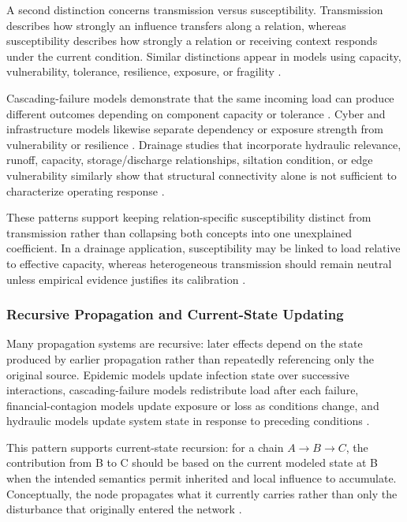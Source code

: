 A second distinction concerns transmission versus susceptibility.
Transmission describes how strongly an influence transfers along a
relation, whereas susceptibility describes how strongly a relation or
receiving context responds under the current condition. Similar
distinctions appear in models using capacity, vulnerability, tolerance,
resilience, exposure, or fragility \citep{buldyrev2010,he2019,
kavallieratos2021,faraji2026}.

Cascading-failure models demonstrate that the same incoming load can
produce different outcomes depending on component capacity or tolerance
\citep{buldyrev2010,he2019,shuang2017}. Cyber and infrastructure models likewise separate
dependency or exposure strength from vulnerability or resilience
\citep{kavallieratos2021,faraji2026,zhou2023}. Drainage studies that incorporate hydraulic
relevance, runoff, capacity, storage/discharge relationships, siltation
condition, or edge vulnerability similarly show that structural
connectivity alone is not sufficient to characterize operating response
\citep{simone2022,simone2023,reyes2020,dastgir2023,dastgir2024,meijer2023,zhang2025}.

These patterns support keeping relation-specific susceptibility distinct
from transmission rather than collapsing both concepts into one
unexplained coefficient. In a drainage application, susceptibility may be
linked to load relative to effective capacity, whereas heterogeneous
transmission should remain neutral unless empirical evidence justifies its
calibration \citep{dastgir2023,meijer2023,zhang2025}.

\subsubsection{Recursive Propagation and Current-State
Updating}\label{recursive-propagation-and-current-state-updating}

Many propagation systems are recursive: later effects depend on the
state produced by earlier propagation rather than repeatedly referencing
only the original source. Epidemic models update infection state over
successive interactions, cascading-failure models redistribute load
after each failure, financial-contagion models update exposure or loss
as conditions change, and hydraulic models update system state in
response to preceding conditions \citep{kermack1927,buldyrev2010,
he2019,faraji2026,petrone2018}.

This pattern supports current-state recursion: for a chain
$A\to B\to C$, the contribution from B to C should be based on the current
modeled state at B when the intended semantics permit inherited and local
influence to accumulate. Conceptually, the node propagates what it
currently carries rather than only the disturbance that originally
entered the network \citep{kermack1927,buldyrev2010,faraji2026}.

